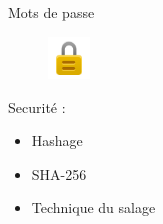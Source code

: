 \begin{frame}{Mots de passe}
\begin{figure}[h!]
  \includegraphics[width=0.10\textwidth]{images/website_-_padlock-512}
\end{figure}
  Securité : 
  \begin{itemize}
  \item Hashage
  \item SHA-256
  \item Technique du salage
  \end{itemize}
\end{frame}